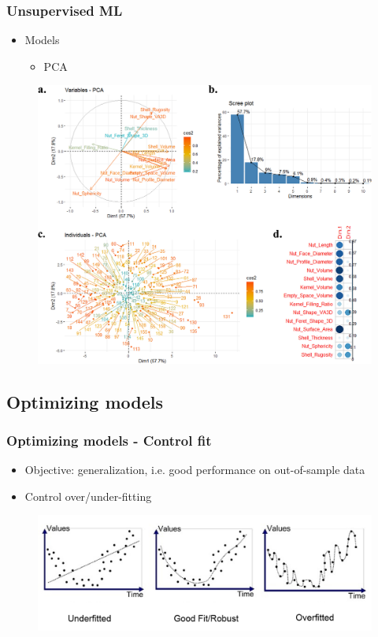 \begin{frame}\frametitle{Unsupervised ML}
   \begin{itemize}
      \item Models
      \begin{itemize}
         \item PCA
      \end{itemize}
   \end{itemize}
   \begin{figure}[H]
      \includegraphics[scale=.13]{../images/illustrations/model_pca_graphs.png}
   \end{figure}
\end{frame}




\subsection{Optimizing models}

\begin{frame}\frametitle{Optimizing models - Control fit}
   \begin{itemize}
      \item Objective: generalization, i.e. good performance on out-of-sample data
      \item Control over/under-fitting
   \end{itemize}
   \begin{figure}[H]
      \includegraphics[scale=.25]{../images/illustrations/model_fit.png}
   \end{figure}
\end{frame}

